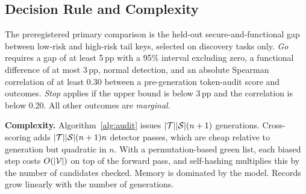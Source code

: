 \subsection{Decision Rule and Complexity}
The preregistered primary comparison is the held-out secure-and-functional gap between low-risk and high-risk tail keys, selected on discovery tasks only. \emph{Go} requires a gap of at least 5\,pp with a 95\% interval excluding zero, a functional difference of at most 3\,pp, normal detection, and an absolute Spearman correlation of at least 0.30 between a pre-generation token-audit score and outcomes. \emph{Stop} applies if the upper bound is below 3\,pp and the correlation is below 0.20. All other outcomes are \emph{marginal}.

\textbf{Complexity.} Algorithm~\ref{alg:audit} issues $|\mathcal{T}||\mathcal{S}|(n+1)$ generations. Cross-scoring adds $|\mathcal{T}||\mathcal{S}|(n+1)n$ detector passes, which are cheap relative to generation but quadratic in $n$. With a permutation-based green list, each biased step costs $O(|\mathcal{V}|)$ on top of the forward pass, and self-hashing multiplies this by the number of candidates checked. Memory is dominated by the model. Records grow linearly with the number of generations.
